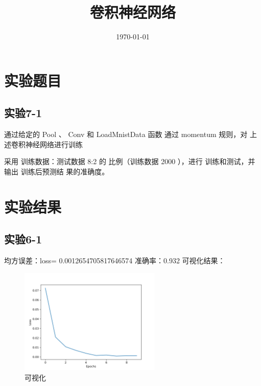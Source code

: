 \documentclass{../source/Experiment}
\title{卷积神经网络}
\date{\today}
\begin{document}
\makecover
\section{实验题目}
\subsection{实验7-1}
通过给定的 Pool 、 Conv 和 LoadMnistData 函数
通过 momentum 规则，对 上述卷积神经网络进行训练

采用 训练数据：测试数据 8:2 的 比例（训练数据
2000 ），进行 训练和测试，并 输出 训练后预测结
果的准确度。

\section{实验结果}
\subsection{实验6-1}
均方误差：loss= 0.0012654705817646574
准确率：0.932
可视化结果：
\begin{figure}[H]
    \centering
    \includegraphics[width = 0.6\textwidth]{Part7/lab10_by_zyl/lab7_1.png}
    \caption{可视化}
\end{figure}
\end{document}
